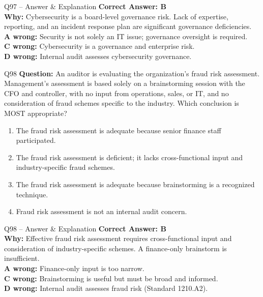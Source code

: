 \documentclass[aspectratio=169,10pt]{beamer}
\begin{document}
	\begin{frame}[t]{Q97 -- Answer \& Explanation}
		\small
		\textbf{Correct Answer: B} \\[4pt]
		\textbf{Why:} Cybersecurity is a board-level governance risk. Lack of expertise, reporting, and an incident response plan are significant governance deficiencies. \\[4pt]
		\textbf{A wrong:} Security is not solely an IT issue; governance oversight is required. \\[2pt]
		\textbf{C wrong:} Cybersecurity is a governance and enterprise risk. \\[2pt]
		\textbf{D wrong:} Internal audit assesses cybersecurity governance.
	\end{frame}
	
	\begin{frame}[t]{Q98}
		\small
		\textbf{Question:} An auditor is evaluating the organization's fraud risk assessment. Management's assessment is based solely on a brainstorming session with the CFO and controller, with no input from operations, sales, or IT, and no consideration of fraud schemes specific to the industry. Which conclusion is MOST appropriate?
		\begin{enumerate}[label=\Alph*.,itemsep=1pt,topsep=2pt]
			\item The fraud risk assessment is adequate because senior finance staff participated.
			\item The fraud risk assessment is deficient; it lacks cross-functional input and industry-specific fraud schemes.
			\item The fraud risk assessment is adequate because brainstorming is a recognized technique.
			\item Fraud risk assessment is not an internal audit concern.
		\end{enumerate}
	\end{frame}
	
	\begin{frame}[t]{Q98 -- Answer \& Explanation}
		\small
		\textbf{Correct Answer: B} \\[4pt]
		\textbf{Why:} Effective fraud risk assessment requires cross-functional input and consideration of industry-specific schemes. A finance-only brainstorm is insufficient. \\[4pt]
		\textbf{A wrong:} Finance-only input is too narrow. \\[2pt]
		\textbf{C wrong:} Brainstorming is useful but must be broad and informed. \\[2pt]
		\textbf{D wrong:} Internal audit assesses fraud risk (Standard 1210.A2).
	\end{frame}
	
\end{document}
